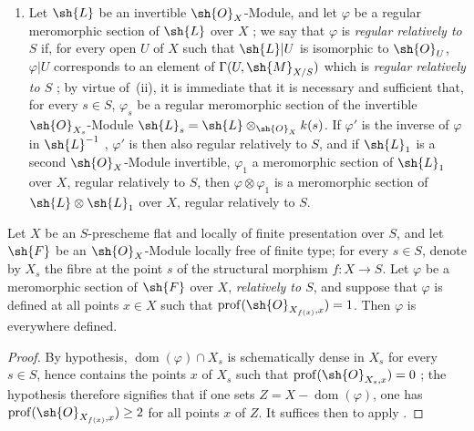 \begin{remarks}[20.6.5]
\begin{enumerate}[label=(\roman*)]
  \item Let $\sh{L}$ be an invertible $\sh{O}_X$-Module, and let $\varphi$ be a regular meromorphic section of $\sh{L}$ over $X$ ;
  we say that $\varphi$ is \emph{regular relatively to $S$} if, for every open $U$ of $X$ such that $\sh{L}|U$ is isomorphic to $\sh{O}_U$, $\varphi|U$ corresponds to an element of $\Gamma(U,\sh{M}_{X/S})$ which is \emph{regular relatively to $S$} ;
  by virtue of~(ii), it is immediate that it is necessary and sufficient that, for every $s\in S$, $\varphi_s$ be a regular meromorphic section  of the invertible $\sh{O}_{X_s}$-Module $\sh{L}_s=\sh{L}\otimes_{\sh{O}_X}k(s)$.
  If $\varphi'$ is the inverse of $\varphi$ in $\sh{L}^{-1}$ , $\varphi'$ is then also regular relatively to $S$, and if $\sh{L}_1$ is a second $\sh{O}_X$-Module invertible, $\varphi_1$ a meromorphic section of $\sh{L}_1$ over $X$, regular relatively to $S$, then $\varphi\otimes\varphi_1$ is a meromorphic section of $\sh{L}\otimes\sh{L}_1$ over $X$, regular relatively to $S$.
\end{enumerate}
\end{remarks}

\begin{proposition}[20.6.6]
\label{IV.20.6.6}
Let $X$ be an $S$-prescheme flat and locally of finite presentation over $S$, and let $\sh{F}$ be an $\sh{O}_X$-Module locally free of finite type;
for every $s\in S$, denote by $X_s$ the fibre at the point $s$ of the structural morphism $f:X\to S$.
Let $\varphi$ be a meromorphic section of $\sh{F}$ over $X$, \emph{relatively to $S$}, and suppose that $\varphi$ is defined at all points $x\in X$ such that $\operatorname{prof}(\sh{O}_{X_{f(x)},x})=1$.
Then $\varphi$ is everywhere defined.
\end{proposition}

\begin{proof}
By hypothesis, $\operatorname{dom}(\varphi)\cap X_s$ is schematically dense in $X_s$ for every $s\in S$, hence contains the points $x$ of $X_s$ such that $\operatorname{prof}(\sh{O}_{X_s,x})=0$ ;
the hypothesis therefore signifies that if one sets $Z=X-\operatorname{dom}(\varphi)$, one has $\operatorname{prof}(\sh{O}_{X_{f(x)},x})\geq 2$ for all points $x$ of $Z$.
It suffices then to apply .
\end{proof}

